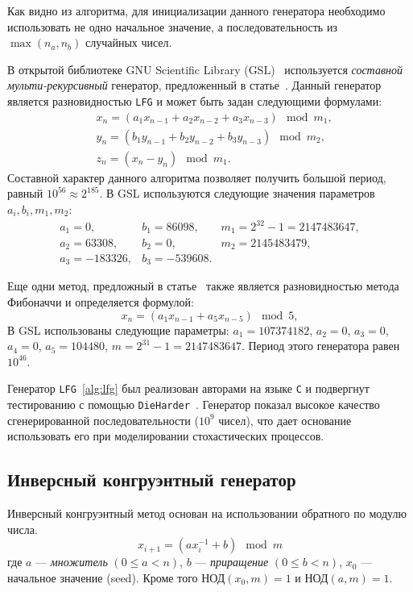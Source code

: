 \documentclass[%
floatfix,
showkeys,
nofootinbib, %
superscriptaddress, %
]{revtex4-1}
\begin{document}
Как видно из алгоритма, для инициализации данного генератора
необходимо использовать не одно начальное значение, а
последовательность из $\max(n_a, n_b)$ случайных чисел.

В открытой библиотеке GNU Scientific Library (GSL)~\cite{L_GSL:2015}
используется \emph{составной мульти-рекурсивный} генератор,
предложенный в статье~\cite{L_Ecuyer:1996}. Данный генератор является
разновидностью \texttt{LFG} и может быть задан следующими формулами:
\[
        \begin{aligned}
                & x_{n} = (a_1 x_{n-1} + a_2 x_{n-2} + a_3 x_{n-3}) \mod m_{1},\\
                & y_{n} = (b_1 y_{n-1} + b_2 y_{n-2} + b_3 y_{n-3}) \mod m_{2},\\
                & z_{n} = (x_{n} - y_{n}) \mod m_{1}.
        \end{aligned}
\]
Составной характер данного алгоритма позволяет получить большой
период, равный $10^{56} \approx 2^{185}$. В GSL используются следующие
значения параметров $a_{i}, b_{i}, m_{1}, m_{2}$:
\[
        \begin{array}{lll}
                a_1 = 0, & b_1 = 86098, & m_1 = 2^{32} - 1 = 2147483647,\\
                a_2 = 63308, & b_2 = 0, & m_2 = 2145483479,\\
                a_3 = -183326, & b_3 = -539608. &
        \end{array}
\]

Еще одни метод, предложный в статье~\cite{L_Ecuyer:1993:1} также
является разновидностью метода Фибоначчи и определяется формулой:
\[
        x_{n} = (a_1 x_{n-1} + a_5 x_{n-5}) \mod 5,
\]
В GSL использованы следующие параметры: $a_1 = 107374182$, $a_2 = 0$,
$a_3 = 0$, $a_4 = 0$, $a_5 = 104480$, $m = 2^{31} - 1 =
2147483647$. Период этого генератора равен $10^{46}$.

Генератор \texttt{LFG}~\ref{alg:lfg} был реализован авторами на языке
\texttt{C} и подвергнут тестированию с помощью
\texttt{DieHarder}~\cite{L_DieHarder:2013}. Генератор показал высокое
качество сгенерированной последовательности ($10^9$ чисел), что дает
основание использовать его при моделировании стохастических процессов.

\subsection{Инверсный конгруэнтный генератор}

Инверсный конгруэнтный метод основан на использовании обратного по
модулю числа.
\[
        x_{i+1} = (a x^{-1}_{i} + b) \mod m
\]
где $a$ --- \emph{множитель} $(0\leqslant a < n)$, $b$ ---
\emph{приращение} $(0\leqslant b < n)$, $x_0$ --- начальное значение
(seed). Кроме того $\text{НОД}(x_0,m)=1$ и $\text{НОД}(a,m)=1$.
\end{document}
